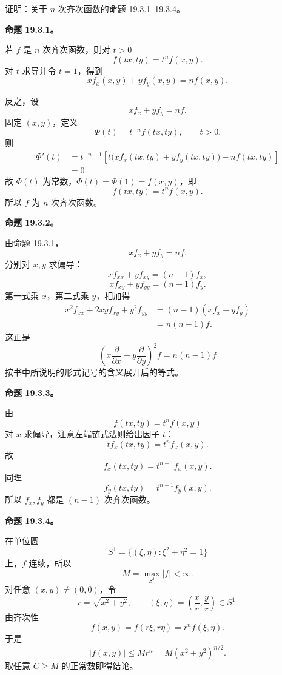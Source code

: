 \begin{xreferenceproblem}[4]
证明：关于 $n$ 次齐次函数的命题 19.3.1--19.3.4。
\end{xreferenceproblem}
\begin{xsolution}
\textbf{命题 19.3.1。}

若 $f$ 是 $n$ 次齐次函数，则对 $t>0$
\[
  f(tx,ty)=t^n f(x,y).
\]
对 $t$ 求导并令 $t=1$，得到
\[
  xf_x(x,y)+yf_y(x,y)=nf(x,y).
\]

反之，设
\[
  xf_x+yf_y=nf.
\]
固定 $(x,y)$，定义
\[
  \Phi(t)=t^{-n}f(tx,ty),
  \qquad t>0.
\]
则
\begin{align*}
  \Phi'(t)
  &=t^{-n-1}
    \left[t\bigl(xf_x(tx,ty)+yf_y(tx,ty)\bigr)-nf(tx,ty)\right]\\
  &=0.
\end{align*}
故 $\Phi(t)$ 为常数，$\Phi(t)=\Phi(1)=f(x,y)$，即
\[
  f(tx,ty)=t^n f(x,y).
\]
所以 $f$ 为 $n$ 次齐次函数。

\textbf{命题 19.3.2。}

由命题 19.3.1，
\[
  xf_x+yf_y=nf.
\]
分别对 $x,y$ 求偏导：
\[
  xf_{xx}+yf_{xy}=(n-1)f_x,
\]
\[
  xf_{xy}+yf_{yy}=(n-1)f_y.
\]
第一式乘 $x$，第二式乘 $y$，相加得
\begin{align*}
  x^2f_{xx}+2xyf_{xy}+y^2f_{yy}
  &=(n-1)(xf_x+yf_y)\\
  &=n(n-1)f.
\end{align*}
这正是
\[
  \left(x\frac\partial{\partial x}
  +y\frac\partial{\partial y}\right)^2f
  =n(n-1)f
\]
按书中所说明的形式记号的含义展开后的等式。

\textbf{命题 19.3.3。}

由
\[
  f(tx,ty)=t^n f(x,y)
\]
对 $x$ 求偏导，注意左端链式法则给出因子 $t$：
\[
  t f_x(tx,ty)=t^n f_x(x,y).
\]
故
\[
  f_x(tx,ty)=t^{n-1}f_x(x,y).
\]
同理
\[
  f_y(tx,ty)=t^{n-1}f_y(x,y).
\]
所以 $f_x,f_y$ 都是 $(n-1)$ 次齐次函数。

\textbf{命题 19.3.4。}

在单位圆
\[
  S^1=\{(\xi,\eta):\xi^2+\eta^2=1\}
\]
上，$f$ 连续，所以
\[
  M=\max_{S^1}|f|<\infty.
\]
对任意 $(x,y)\ne(0,0)$，令
\[
  r=\sqrt{x^2+y^2},
  \qquad
  (\xi,\eta)=\left(\frac xr,\frac yr\right)\in S^1.
\]
由齐次性
\[
  f(x,y)=f(r\xi,r\eta)=r^n f(\xi,\eta).
\]
于是
\[
  |f(x,y)|\le M r^n
  =M(x^2+y^2)^{n/2}.
\]
取任意 $C\ge M$ 的正常数即得结论。
\end{xsolution}


